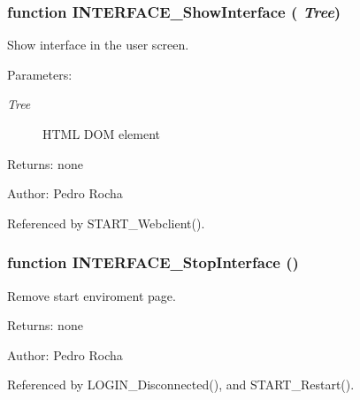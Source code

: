 \subsubsection[INTERFACE\_\-ShowInterface]{\setlength{\rightskip}{0pt plus 5cm}function INTERFACE\_\-ShowInterface ( {\em Tree})}\label{interface_8js_e3cc5b666e93acdd2f85cee061a5ed65}


Show interface in the user screen. 

\begin{Desc}
\item[Parameters:]
\begin{description}
\item[{\em Tree}]HTML DOM element \end{description}
\end{Desc}
\begin{Desc}
\item[Returns:]none \end{Desc}
\begin{Desc}
\item[Author:]Pedro Rocha \end{Desc}


Referenced by START\_\-Webclient().
\subsubsection[INTERFACE\_\-StopInterface]{\setlength{\rightskip}{0pt plus 5cm}function INTERFACE\_\-StopInterface ()}\label{interface_8js_9140670d04ba65dc1eeba2dd11979e04}


Remove start enviroment page. 

\begin{Desc}
\item[Returns:]none \end{Desc}
\begin{Desc}
\item[Author:]Pedro Rocha \end{Desc}


Referenced by LOGIN\_\-Disconnected(), and START\_\-Restart().